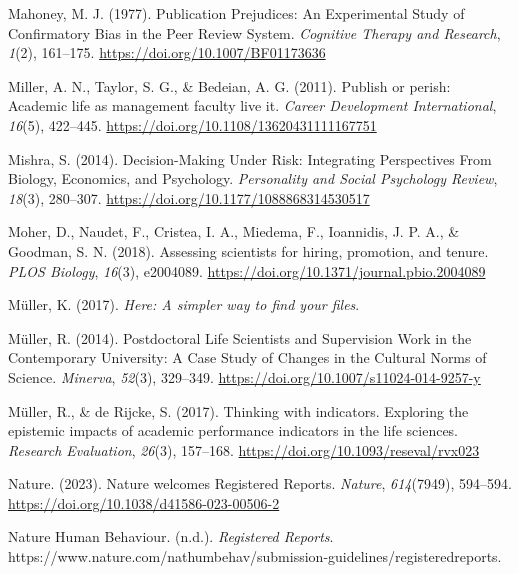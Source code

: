 \documentclass[
  ,man,mask,floatsintext]{apa6}
\newlength{\cslhangindent}
\newlength{\cslentryspacingunit} %
\newenvironment{CSLReferences}[2] %
 {%
  \setlength{\parindent}{0pt}
  \ifodd #1
  \let\oldpar\par
  \def\par{\hangindent=\cslhangindent\oldpar}
  \fi
  \setlength{\parskip}{#2\cslentryspacingunit}
 }%
 {}
\begin{document}
\begin{CSLReferences}{1}{0}
\leavevmode{}%
Mahoney, M. J. (1977). Publication {Prejudices}: {An Experimental Study} of {Confirmatory Bias} in the {Peer Review System}. \emph{Cognitive Therapy and Research}, \emph{1}(2), 161--175. \url{https://doi.org/10.1007/BF01173636}

\leavevmode{}%
Miller, A. N., Taylor, S. G., \& Bedeian, A. G. (2011). Publish or perish: Academic life as management faculty live it. \emph{Career Development International}, \emph{16}(5), 422--445. \url{https://doi.org/10.1108/13620431111167751}

\leavevmode{}%
Mishra, S. (2014). Decision-{Making Under Risk}: {Integrating Perspectives From Biology}, {Economics}, and {Psychology}. \emph{Personality and Social Psychology Review}, \emph{18}(3), 280--307. \url{https://doi.org/10.1177/1088868314530517}

\leavevmode{}%
Moher, D., Naudet, F., Cristea, I. A., Miedema, F., Ioannidis, J. P. A., \& Goodman, S. N. (2018). Assessing scientists for hiring, promotion, and tenure. \emph{PLOS Biology}, \emph{16}(3), e2004089. \url{https://doi.org/10.1371/journal.pbio.2004089}

\leavevmode{}%
Müller, K. (2017). \emph{Here: {A} simpler way to find your files}.

\leavevmode{}%
Müller, R. (2014). Postdoctoral {Life Scientists} and {Supervision Work} in the {Contemporary University}: {A Case Study} of {Changes} in the {Cultural Norms} of {Science}. \emph{Minerva}, \emph{52}(3), 329--349. \url{https://doi.org/10.1007/s11024-014-9257-y}

\leavevmode{}%
Müller, R., \& de Rijcke, S. (2017). Thinking with indicators. {Exploring} the epistemic impacts of academic performance indicators in the life sciences. \emph{Research Evaluation}, \emph{26}(3), 157--168. \url{https://doi.org/10.1093/reseval/rvx023}

\leavevmode{}%
Nature. (2023). Nature welcomes {Registered Reports}. \emph{Nature}, \emph{614}(7949), 594--594. \url{https://doi.org/10.1038/d41586-023-00506-2}

\leavevmode{}%
Nature Human Behaviour. (n.d.). \emph{Registered {Reports}}. https://www.nature.com/nathumbehav/submission-guidelines/registeredreports.


\end{CSLReferences}
\end{document}
